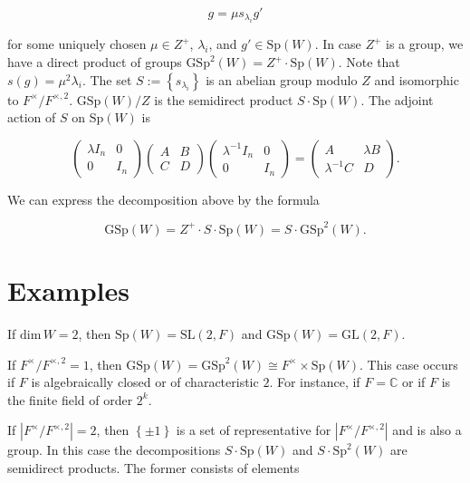 \documentclass[12pt]{article}
\begin{document}
\[g = \mu s_{\lambda_{i}} g'\]

for some uniquely chosen $\mu \in Z^{+}$, $\lambda_{i}$, and $g' \in
\text{Sp}\left(W\right)$. In case $Z^{+}$ is a group, we have a direct product
of groups $\text{GSp}^2\left(W\right) = Z^{+} \cdot \text{Sp}\left(W\right)$.
Note that $s\left(g\right) = \mu^2 \lambda_{i}$. The set $S :=
\left\{s_{\lambda_{i}}\right\}$ is an abelian group modulo $Z$ and isomorphic to
$F^{\times}/F^{\times,2}$. $\text{GSp}\left(W\right)/Z$ is the semidirect
product $S \cdot \text{Sp}\left(W\right)$. The adjoint action of $S$ on
$\text{Sp}\left(W\right)$ is

\[\begin{pmatrix} \lambda I_{n} & 0 \\ 0 & I_{n} \end{pmatrix} \begin{pmatrix} A & B
\\ C & D \end{pmatrix} \begin{pmatrix} \lambda^{-1} I_{n} & 0 \\ 0 & I_{n}
\end{pmatrix} = \begin{pmatrix} A & \lambda B \\ \lambda^{-1}C & D
\end{pmatrix}.\]

We can express the decomposition above by the formula

\[\text{GSp}\left(W\right) = Z^{+} \cdot S \cdot \text{Sp}\left(W\right) = S
\cdot \text{GSp}^2\left(W\right).\]

\section{Examples}

If $\text{dim} \, W = 2$, then $\text{Sp}\left(W\right) = \text{SL}\left(2,
F\right)$ and $\text{GSp}\left(W\right) = \text{GL}\left(2, F\right)$.

If $F^{\times}/F^{\times, 2} = 1$, then $\text{GSp}\left(W\right) =
\text{GSp}^2\left(W\right) \cong F^{\times} \times \text{Sp}\left(W\right)$.
This case occurs if $F$ is algebraically closed or of characteristic $2$. For
instance, if $F = \mathbb{C}$ or if $F$ is the finite field of order $2^{k}$.

If $\left|F^{\times}/F^{\times, 2}\right| = 2$, then $\left\{ \pm 1 \right\}$ is
a set of representative for $\left|F^{\times}/F^{\times,2}\right|$ and is also a
group. In this case the decompositions $S \cdot \text{Sp}\left(W\right)$ and $S
\cdot \text{Sp}^{2}\left(W\right)$ are semidirect products. The former consists
of elements
\end{document}
